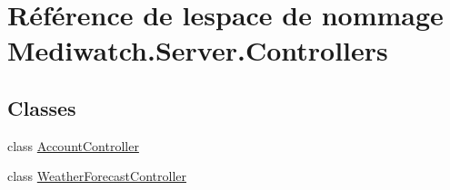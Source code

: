 \hypertarget{namespace_mediwatch_1_1_server_1_1_controllers}{}\section{Référence de l\textquotesingle{}espace de nommage Mediwatch.\+Server.\+Controllers}
\label{namespace_mediwatch_1_1_server_1_1_controllers}
\subsection*{Classes}
\begin{DoxyCompactItemize}
\item 
class \hyperlink{class_mediwatch_1_1_server_1_1_controllers_1_1_account_controller}{Account\+Controller}
\item 
class \hyperlink{class_mediwatch_1_1_server_1_1_controllers_1_1_weather_forecast_controller}{Weather\+Forecast\+Controller}
\end{DoxyCompactItemize}
